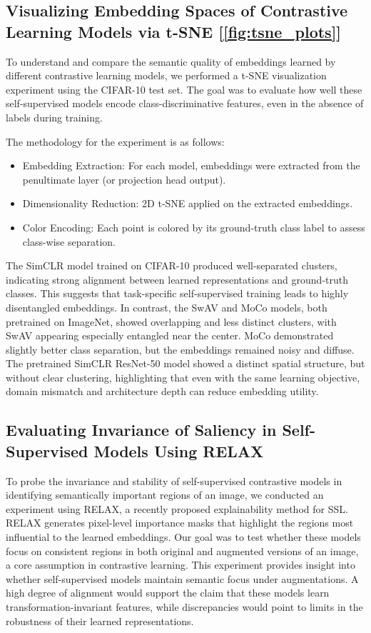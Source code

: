 \subsection{Visualizing Embedding Spaces of Contrastive Learning Models via t-SNE [\ref{fig:tsne_plots}]}
To understand and compare the semantic quality of embeddings learned by different contrastive learning models, we performed a t-SNE visualization experiment using the CIFAR-10 test set. The goal was to evaluate how well these self-supervised models encode class-discriminative features, even in the absence of labels during training. 

The methodology for the experiment is as follows:
\begin{itemize}

\item Embedding Extraction: For each model, embeddings were extracted from the penultimate layer (or projection head output).
\item Dimensionality Reduction: 2D t-SNE applied on the extracted embeddings.
\item Color Encoding: Each point is colored by its ground-truth class label to assess class-wise separation.
\end{itemize}


The SimCLR model trained on CIFAR-10 produced well-separated clusters, indicating strong alignment between learned representations and ground-truth classes. This suggests that task-specific self-supervised training leads to highly disentangled embeddings. In contrast, the SwAV and MoCo models, both pretrained on ImageNet, showed overlapping and less distinct clusters, with SwAV appearing especially entangled near the center. MoCo demonstrated slightly better class separation, but the embeddings remained noisy and diffuse. The pretrained SimCLR ResNet-50 model showed a distinct spatial structure, but without clear clustering, highlighting that even with the same learning objective, domain mismatch and architecture depth can reduce embedding utility.


\subsection{Evaluating Invariance of Saliency in Self-Supervised Models Using RELAX}

To probe the invariance and stability of self-supervised contrastive models in identifying semantically important regions of an image, we conducted an experiment using RELAX, a recently proposed explainability method for SSL. RELAX generates pixel-level importance masks that highlight the regions most influential to the learned embeddings. Our goal was to test whether these models focus on consistent regions in both original and augmented versions of an image, a core assumption in contrastive learning. This experiment provides insight into whether self-supervised models maintain semantic focus under augmentations. A high degree of alignment would support the claim that these models learn transformation-invariant features, while discrepancies would point to limits in the robustness of their learned representations. 

